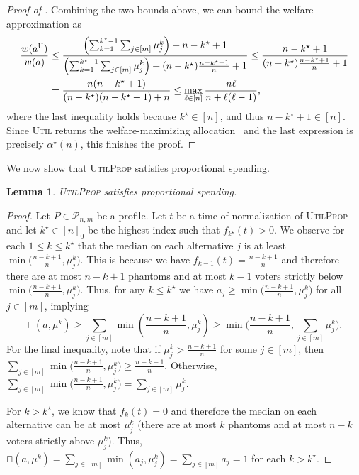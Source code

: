 \documentclass[11pt]{article}
\newcommand{\overlap}[2]{\sqcap(#1, #2)}
\newcommand{\Ut}{\textsc{Util} }
\newcommand{\UtP}{\textsc{UtilProp} }
\newcommand{\Uts}{\textsc{U} } %
\newtheorem{lemma}{Lemma}
\begin{document}
\begin{proof}[Proof of ]
     Combining the two bounds above, we can bound the welfare approximation as
     \begin{align*}
        \frac{w(a^\Uts)}{w(a)} 
        & \le \frac{\left(\sum_{k = 1}^{k^\star-1} \sum_{j \in [m]} \mu^k_j \right) + n - k^\star + 1}{\left( \sum_{k = 1}^{k^\star-1} \sum_{j \in [m]} \mu^k_j \right) + (n-k^\star) \frac{n-k^\star+1}{n} + 1}
        \le \frac{n - k^\star + 1}{(n-k^\star) \frac{n-k^\star+1}{n} + 1}\\%
        & = \frac{n (n - k^\star + 1)}{(n-k^\star) (n-k^\star+1) + n}
        \leq \max_{\ell\in [n]} \frac{n\ell}{n+\ell(\ell-1)},
     \end{align*}
    where the last inequality holds because $k^\star\in [n]$, and thus $n-k^\star+1\in [n]$.
    Since \Ut returns the welfare-maximizing allocation~\citep{freeman2021truthful} and the last expression is precisely $\alpha^\star(n)$, this finishes the proof.
\end{proof}



We now show that \UtP satisfies proportional spending.

\begin{lemma} \label{lem:UtilProp_lower_bound}
    \UtP satisfies proportional spending.
\end{lemma}

\begin{proof}
    Let $P \in \mathcal{P}_{n,m}$ be a profile. Let $t$ be a time of normalization of \UtP and let $k^\star \in [n]_0$ be the highest index such that $f_{k^\star}(t) > 0$. We observe for each $1 \le k \le k^\star$ that
    the median on each alternative $j$ is at least $\min\big(\frac{n-k+1}{n}, \mu^k_j\big)$. This is because we have $f_{k-1}(t) = \frac{n-k+1}{n}$ and therefore there are at most $n-k+1$ phantoms and at most $k-1$ voters strictly below $\min\big(\frac{n-k+1}{n}, \mu^k_j\big)$.
    Thus, for any $k \le k^\star$ we have $a_j \ge \min\big(\frac{n-k+1}{n}, \mu^k_j\big)$ for all $j \in [m]$, implying
    $$
        \overlap{a}{\mu^k} \ge \sum_{j\in [m]} \min \left(\frac{n-k+1}{n}, \mu^k_j \right) \ge  \min\Bigg( \frac{n-k+1}{n}, \sum_{j \in [m]} \mu^k_j \Bigg)
    .$$
    For the final inequality, note that if $\mu^k_j>\frac{n-k+1}{n}$ for some $j \in [m]$, then $\sum_{j\in [m]} \min \big(\frac{n-k+1}{n}, \mu^k_j \big) \ge \frac{n-k+1}{n}$. Otherwise, $\sum_{j\in [m]} \min \big(\frac{n-k+1}{n}, \mu^k_j \big) = \sum_{j \in [m]} \mu^k_j$.

    For $k > k^\star$, we know that $f_k(t) = 0$ and therefore the median on each alternative can be at most $\mu^k_j$ (there are at most $k$ phantoms and at most $n-k$ voters strictly above $\mu^k_j$).
    Thus, $\overlap{a}{\mu^k} = \sum_{j\in [m]} \min(a_j, \mu^k_j) = \sum_{j\in [m]} a_j = 1$ for each $k > k^\star$.
\end{proof}
\end{document}
